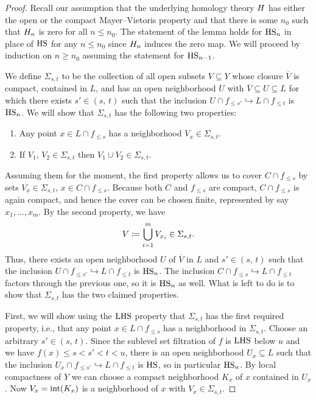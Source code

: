 \begin{proof}
	Recall our assumption that the underlying homology theory $H$ has either the open or the compact Mayer--Vietoris property and that there is some $n_0$ such that $H_{n}$ is zero for all $n \leq n_0$.
	The statement of the lemma holds for $\mathrm{HS}_{n}$ in place of $\mathrm{HS}$ for any $n \leq n_0$ since $H_{n}$ induces the zero map.
	We will proceed by induction on $n \geq n_0$ assuming the statement for $\mathrm{HS}_{n-1}$.

	We define $\Sigma_{s, t}$ to be the collection of all open subsets $V \subseteq Y$ whose closure $\overline{V}$ is compact, contained in $L$, and has an open neighborhood $U$ with $\overline{V} \subseteq U \subseteq L$	for which there exists $s' \in (s,\, t)$ such that the inclusion $U \cap f_{\leq s'} \hookrightarrow L \cap f_{\leq t}$ is $\mathrm{HS}_n$.
	We will show that $\Sigma_{s, t}$ has the following two properties:
	\begin{enumerate}
		\item Any point $x \in L \cap f_{\leq s}$ has a neighborhood $V_x \in \Sigma_{s,t}$.
		\item If $V_1,\, V_2 \in \Sigma_{s,t}$ then $V_1 \cup V_2 \in \Sigma_{s,t}$.
	\end{enumerate}

	Assuming them for the moment, the first property allows us to cover $C \cap f_{\leq s}$ by sets $V_x \in \Sigma_{s,t}$, $x \in C \cap f_{\leq s}$.
	Because both $C$ and $f_{\leq s}$ are compact, $C \cap f_{\leq s}$ is again compact, and hence the cover can be chosen finite, represented by say $x_1,\dots, x_m$.
	By the second property, we have
	\[V \coloneqq \bigcup_{i = 1}^m V_{x_i} \in \Sigma_{s,t}.\]
	Thus, there exists an open neighborhood $U$ of $\overline{V}$ in $L$ and $s' \in (s,\, t)$ such that the inclusion
	$U \cap f_{\leq s'} \hookrightarrow L \cap f_{\leq t}$
	is $\mathrm{HS}_n$.
	The inclusion
	$C \cap f_{\leq s} \hookrightarrow L \cap f_{\leq t}$
	factors through the previous one, so it is $\mathrm{HS}_n$ as well.
	What is left to do is to show that $\Sigma_{s,t}$ has the two claimed properties.


	First, we will show using the $\mathrm{LHS}$ property that $\Sigma_{s, t}$ has the first required property, i.e., that any point $x \in L \cap f_{\leq s}$ has a neighborhood in $\Sigma_{s, t}$.
	Choose an arbitrary $s' \in (s,\, t)$.
	Since the sublevel set filtration of $f$ is $\mathrm{LHS}$ below $u$ and we have $f(x) \leq s < s' < t < u$, there is an open neighborhood $U_x \subseteq L$ such that the inclusion
	$U_x \cap f_{\leq s'} \hookrightarrow L \cap f_{\leq t}$
	is $\mathrm{HS}$, so in particular $\mathrm{HS}_n$.
	By local compactness of $Y$ we can choose a compact neighborhood $K_x$ of $x$ contained in $U_x$.
	Now $V_x = \operatorname{int} (K_x)$ is a neighborhood of $x$ with $V_x \in \Sigma_{s,t}$.


\end{proof}
